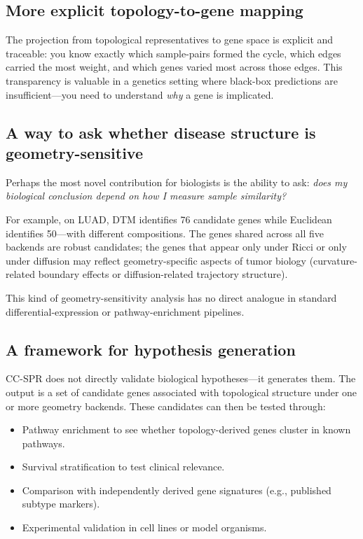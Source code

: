 \documentclass[11pt]{article}
\begin{document}
\subsection{More explicit topology-to-gene mapping}

The projection from topological representatives to gene space is explicit and traceable: you know exactly which sample-pairs formed the cycle, which edges carried the most weight, and which genes varied most across those edges.
This transparency is valuable in a genetics setting where black-box predictions are insufficient---you need to understand \emph{why} a gene is implicated.

\subsection{A way to ask whether disease structure is geometry-sensitive}

Perhaps the most novel contribution for biologists is the ability to ask: \emph{does my biological conclusion depend on how I measure sample similarity?}

For example, on LUAD, DTM identifies 76 candidate genes while Euclidean identifies 50---with different compositions.
The genes shared across all five backends are robust candidates; the genes that appear only under Ricci or only under diffusion may reflect geometry-specific aspects of tumor biology (curvature-related boundary effects or diffusion-related trajectory structure).

This kind of geometry-sensitivity analysis has no direct analogue in standard differential-expression or pathway-enrichment pipelines.

\subsection{A framework for hypothesis generation}

CC-SPR does not directly validate biological hypotheses---it generates them.
The output is a set of candidate genes associated with topological structure under one or more geometry backends.
These candidates can then be tested through:
\begin{itemize}[leftmargin=1.5em]
\item Pathway enrichment to see whether topology-derived genes cluster in known pathways.
\item Survival stratification to test clinical relevance.
\item Comparison with independently derived gene signatures (e.g., published subtype markers).
\item Experimental validation in cell lines or model organisms.
\end{itemize}
\end{document}
